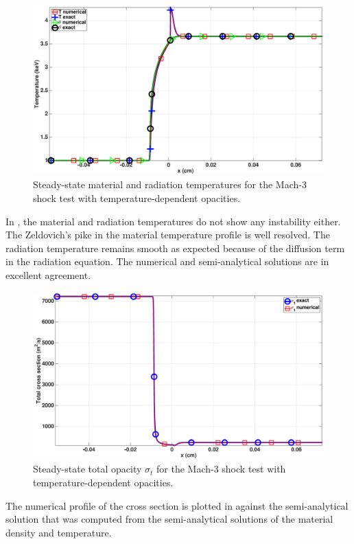 \documentclass[times,doublespace]{fldauth}%
\begin{document}
\begin{figure}[H]
    \centering
    \includegraphics[width=\textwidth]{figures/dpt-xs/mach_3_nel_1000_temperature.eps}
    \caption{Steady-state material and radiation temperatures for the Mach-3 shock test with temperature-dependent opacities.}\label{fig:mach-3-dpt-xs-temp}
\end{figure}
%
In , the material and radiation temperatures do not show any instability either. The Zeldovich's pike in the material temperature profile is well resolved. The radiation temperature remains smooth as expected because of the diffusion term in the radiation equation. The numerical and semi-analytical solutions are in excellent agreement. 
%
\begin{figure}[H]
    \centering
    \includegraphics[width=\textwidth]{figures/dpt-xs/mach_3_nel_1000_total_cross_section.eps}
    \caption{Steady-state total opacity $\sigma_t$ for the Mach-3 shock test with temperature-dependent opacities.}\label{fig:mach-3-dpt-xs-xs}
\end{figure}
%
The numerical profile of the cross section is plotted in  against the semi-analytical solution that was computed from the semi-analytical solutions of the material density and temperature. 
\end{document}
